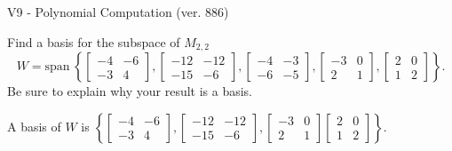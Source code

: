 \begin{exercise}
  \begin{exerciseTitle}V9 - Polynomial Computation (ver. 886)\end{exerciseTitle}
  \begin{exerciseStatement}
    Find a basis for the subspace of \(M_{2,2}\) 
\[W=\mathrm{span}\ \left\{\left[\begin{array}{cc}
-4 & -6 \\
-3 & 4
\end{array}\right] , \left[\begin{array}{cc}
-12 & -12 \\
-15 & -6
\end{array}\right] , \left[\begin{array}{cc}
-4 & -3 \\
-6 & -5
\end{array}\right] , \left[\begin{array}{cc}
-3 & 0 \\
2 & 1
\end{array}\right] , \left[\begin{array}{cc}
2 & 0 \\
1 & 2
\end{array}\right]\right\}.\]
 Be sure to explain why your result is a basis.


  \end{exerciseStatement}
  \begin{exerciseAnswer}
   A basis of \(W\) is  \(\left\{\left[\begin{array}{cc}
-4 & -6 \\
-3 & 4
\end{array}\right] , \left[\begin{array}{cc}
-12 & -12 \\
-15 & -6
\end{array}\right] , \left[\begin{array}{cc}
-3 & 0 \\
2 & 1
\end{array}\right] \left[\begin{array}{cc}
2 & 0 \\
1 & 2
\end{array}\right]\right\}\).
  


  \end{exerciseAnswer}
\end{exercise}